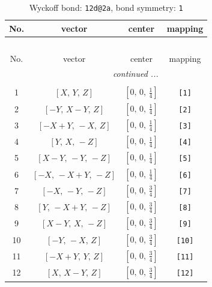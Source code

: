 \documentclass[fleqn,8pt]{jsarticle}
\begin{document}
\begin{longtable}{cccc}
\caption{Wyckoff bond: {\tt 12d@2a}, bond symmetry: {\tt 1}}
 \\
 \hline \hline
No. & vector & center & mapping \\ \hline \endfirsthead

\multicolumn{3}{l}{\tablename\ \thetable{}} \\
 \hline \hline
No. & vector & center & mapping \\ \hline \endhead

 \hline \hline
\multicolumn{3}{r}{\footnotesize\it continued ...} \\ \endfoot

 \hline \hline
\multicolumn{3}{r}{} \\ \endlastfoot

1 & $\left[ X,\, Y,\, Z \right]$ & $\left[ 0,\, 0,\, \frac{1}{4} \right]$ & {\tt [1]} \\ \hline
2 & $\left[ - Y,\, X - Y,\, Z \right]$ & $\left[ 0,\, 0,\, \frac{1}{4} \right]$ & {\tt [2]} \\ \hline
3 & $\left[ - X + Y,\, - X,\, Z \right]$ & $\left[ 0,\, 0,\, \frac{1}{4} \right]$ & {\tt [3]} \\ \hline
4 & $\left[ Y,\, X,\, - Z \right]$ & $\left[ 0,\, 0,\, \frac{1}{4} \right]$ & {\tt [4]} \\ \hline
5 & $\left[ X - Y,\, - Y,\, - Z \right]$ & $\left[ 0,\, 0,\, \frac{1}{4} \right]$ & {\tt [5]} \\ \hline
6 & $\left[ - X,\, - X + Y,\, - Z \right]$ & $\left[ 0,\, 0,\, \frac{1}{4} \right]$ & {\tt [6]} \\ \hline
7 & $\left[ - X,\, - Y,\, - Z \right]$ & $\left[ 0,\, 0,\, \frac{3}{4} \right]$ & {\tt [7]} \\ \hline
8 & $\left[ Y,\, - X + Y,\, - Z \right]$ & $\left[ 0,\, 0,\, \frac{3}{4} \right]$ & {\tt [8]} \\ \hline
9 & $\left[ X - Y,\, X,\, - Z \right]$ & $\left[ 0,\, 0,\, \frac{3}{4} \right]$ & {\tt [9]} \\ \hline
10 & $\left[ - Y,\, - X,\, Z \right]$ & $\left[ 0,\, 0,\, \frac{3}{4} \right]$ & {\tt [10]} \\ \hline
11 & $\left[ - X + Y,\, Y,\, Z \right]$ & $\left[ 0,\, 0,\, \frac{3}{4} \right]$ & {\tt [11]} \\ \hline
12 & $\left[ X,\, X - Y,\, Z \right]$ & $\left[ 0,\, 0,\, \frac{3}{4} \right]$ & {\tt [12]} \\
\end{longtable}
\end{document}
